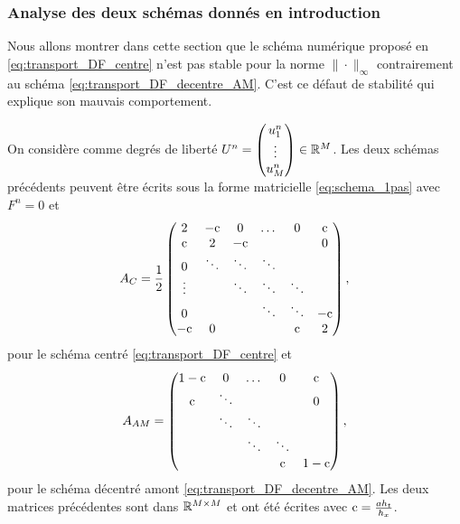 \documentclass[12pt,a4paper,twoside]{article}
\begin{document}
\subsubsection{Analyse des deux sch\'emas donn\'es en introduction}
\label{subsubsec:deux_schemas}


Nous allons montrer dans cette section que le sch\'ema num\'erique 
propos\'e en \eqref{eq:transport_DF_centre} n'est pas stable pour la norme $\| \cdot \|_{\infty}$
contrairement au sch\'ema \eqref{eq:transport_DF_decentre_AM}.
C'est ce d\'efaut de stabilit\'e qui explique son mauvais comportement.

On consid\`ere comme degr\'es de libert\'e
$U^n = 
\begin{pmatrix}
  u_1^n \\ \vdots \\ u_{M}^n
\end{pmatrix}
\in \mathbb{R}^M
$.
Les deux sch\'emas pr\'ec\'edents peuvent \^etre \'ecrits sous la forme matricielle 
\eqref{eq:schema_1pas} avec $F^n = 0$ et
\begin{align}
  A_{C} = \dfrac{1}{2}
  \begin{pmatrix}
    2 & -\mathrm{c} & 0 & \dots & 0 & \mathrm{c}
    \\
    \mathrm{c} & 2 & -\mathrm{c} & & & 0
    \\
    0 & \ddots & \ddots & \ddots & &
    \\
    \vdots & & \ddots & \ddots & \ddots
    \\
    0 & & & \ddots & \ddots & -\mathrm{c}
    \\
    -\mathrm{c} & 0 & & & \mathrm{c} & 2
  \end{pmatrix},
\end{align}
pour le sch\'ema centr\'e \eqref{eq:transport_DF_centre}
et
\begin{align}
  \label{eq:trans_mat_per_AM}
  A_{AM} = 
  \begin{pmatrix}
    1-\mathrm{c} & 0 & \dots & 0 & \mathrm{c}
    \\
    \mathrm{c} & \ddots & & & 0
    \\
    & \ddots & \ddots &   &
    \\
    & & \ddots & \ddots &
    \\
    &&   &  \mathrm{c} & 1-\mathrm{c}
  \end{pmatrix},
\end{align}
pour le sch\'ema d\'ecentr\'e amont \eqref{eq:transport_DF_decentre_AM}.
Les deux matrices pr\'ec\'edentes sont dans
$\mathbb{R}^{M \times M}$ et ont \'et\'e \'ecrites avec 
$\mathrm{c} = \frac{a h_t}{h_x}$.
\end{document}

